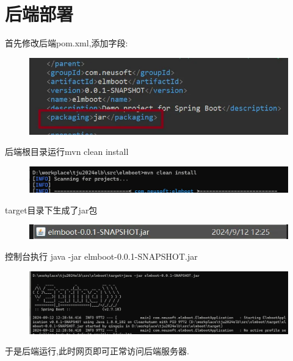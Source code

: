 \section{后端部署}

首先修改后端pom.xml,添加字段:
\begin{figure}[H]
    \centering
    \includegraphics[width=0.8\linewidth]{pics/部署4.png}
\end{figure}
后端根目录运行mvn clean install
\begin{figure}[H]
    \centering
    \includegraphics[width=1\linewidth]{pics/部署5.png}
\end{figure}
target目录下生成了jar包
\begin{figure}[H]
    \centering
    \includegraphics[width=1\linewidth]{pics/部署6.png}
\end{figure}
控制台执行 java -jar elmboot-0.0.1-SNAPSHOT.jar
\begin{figure}[H]
    \centering
    \includegraphics[width=0.8\linewidth]{pics/部署7.png}
\end{figure}
于是后端运行,此时网页即可正常访问后端服务器.
